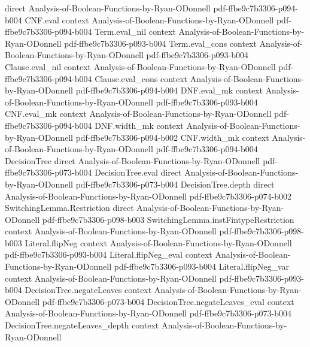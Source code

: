\begin{theorem}
  {direct}
  {Analysis-of-Boolean-Functions-by-Ryan-ODonnell}
  {pdf-ffbe9c7b3306-p094-b004}
\proofstep
  {CNF.eval}
  {context}
  {Analysis-of-Boolean-Functions-by-Ryan-ODonnell}
  {pdf-ffbe9c7b3306-p094-b004}
\proofstep
  {Term.eval_nil}
  {context}
  {Analysis-of-Boolean-Functions-by-Ryan-ODonnell}
  {pdf-ffbe9c7b3306-p093-b004}
\proofstep
  {Term.eval_cons}
  {context}
  {Analysis-of-Boolean-Functions-by-Ryan-ODonnell}
  {pdf-ffbe9c7b3306-p093-b004}
\proofstep
  {Clause.eval_nil}
  {context}
  {Analysis-of-Boolean-Functions-by-Ryan-ODonnell}
  {pdf-ffbe9c7b3306-p094-b004}
\proofstep
  {Clause.eval_cons}
  {context}
  {Analysis-of-Boolean-Functions-by-Ryan-ODonnell}
  {pdf-ffbe9c7b3306-p094-b004}
\proofstep
  {DNF.eval_mk}
  {context}
  {Analysis-of-Boolean-Functions-by-Ryan-ODonnell}
  {pdf-ffbe9c7b3306-p093-b004}
\proofstep
  {CNF.eval_mk}
  {context}
  {Analysis-of-Boolean-Functions-by-Ryan-ODonnell}
  {pdf-ffbe9c7b3306-p094-b004}
\proofstep
  {DNF.width_mk}
  {context}
  {Analysis-of-Boolean-Functions-by-Ryan-ODonnell}
  {pdf-ffbe9c7b3306-p094-b002}
\proofstep
  {CNF.width_mk}
  {context}
  {Analysis-of-Boolean-Functions-by-Ryan-ODonnell}
  {pdf-ffbe9c7b3306-p094-b004}
\proofstep
  {DecisionTree}
  {direct}
  {Analysis-of-Boolean-Functions-by-Ryan-ODonnell}
  {pdf-ffbe9c7b3306-p073-b004}
\proofstep
  {DecisionTree.eval}
  {direct}
  {Analysis-of-Boolean-Functions-by-Ryan-ODonnell}
  {pdf-ffbe9c7b3306-p073-b004}
\proofstep
  {DecisionTree.depth}
  {direct}
  {Analysis-of-Boolean-Functions-by-Ryan-ODonnell}
  {pdf-ffbe9c7b3306-p074-b002}
\proofstep
  {SwitchingLemma.Restriction}
  {direct}
  {Analysis-of-Boolean-Functions-by-Ryan-ODonnell}
  {pdf-ffbe9c7b3306-p098-b003}
\proofstep
  {SwitchingLemma.instFintypeRestriction}
  {context}
  {Analysis-of-Boolean-Functions-by-Ryan-ODonnell}
  {pdf-ffbe9c7b3306-p098-b003}
\proofstep
  {Literal.flipNeg}
  {context}
  {Analysis-of-Boolean-Functions-by-Ryan-ODonnell}
  {pdf-ffbe9c7b3306-p093-b004}
\proofstep
  {Literal.flipNeg_eval}
  {context}
  {Analysis-of-Boolean-Functions-by-Ryan-ODonnell}
  {pdf-ffbe9c7b3306-p093-b004}
\proofstep
  {Literal.flipNeg_var}
  {context}
  {Analysis-of-Boolean-Functions-by-Ryan-ODonnell}
  {pdf-ffbe9c7b3306-p093-b004}
\proofstep
  {DecisionTree.negateLeaves}
  {context}
  {Analysis-of-Boolean-Functions-by-Ryan-ODonnell}
  {pdf-ffbe9c7b3306-p073-b004}
\proofstep
  {DecisionTree.negateLeaves_eval}
  {context}
  {Analysis-of-Boolean-Functions-by-Ryan-ODonnell}
  {pdf-ffbe9c7b3306-p073-b004}
\proofstep
  {DecisionTree.negateLeaves_depth}
  {context}
  {Analysis-of-Boolean-Functions-by-Ryan-ODonnell}

\end{theorem}
